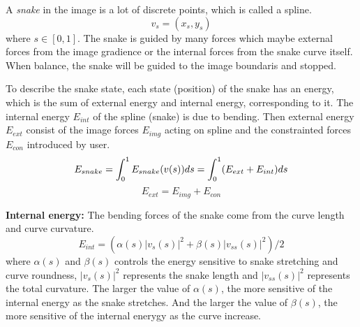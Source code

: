 A \emph{snake} in the image is a lot of discrete points, which is called a spline.
\begin{equation}
v_s = (x_s, y_s)
\end{equation}
where $s \in [0,1]$. The snake is guided by many forces which maybe external forces from the image gradience or the internal forces from the snake curve itself. When balance, the snake will be guided to the image boundaris and stopped.

To describe the snake state, each state (position) of the snake has an energy, which is the sum of external energy and internal energy, corresponding to it. The internal energy $E_{int}$ of the spline (snake) is due to bending. Then external energy $E_{ext}$ consist of the image forces $E_{img}$ acting on spline and the constrainted forces $E_{con}$ introduced by user. 
\begin{equation}
E_{snake} = \int_0^1E_{snake}(v(s))ds = \int_0^1(E_{ext} + E_{int})ds \\
\end{equation}
\begin{equation}
E_{ext} = E_{img} + E_{con}
\end{equation}

\textbf{Internal energy: } The bending forces of the snake come from the curve length and curve curvature.
\begin{equation}\label{eqn:int-energy}
E_{int} = (\alpha(s)|v_s(s)|^2 + \beta(s)|v_{ss}(s)|^2)/2
\end{equation}
where $\alpha(s)$ and $\beta(s)$ controls the energy sensitive to snake stretching and curve roundness, $|v_s(s)|^2$ represents the snake length and $|v_{ss}(s)|^2$ represents the total curvature. The larger the value of $\alpha(s)$, the more sensitive of the internal energy as the snake stretches. And the larger the value of $\beta(s)$, the more sensitive of the internal enerygy as the curve increase.

